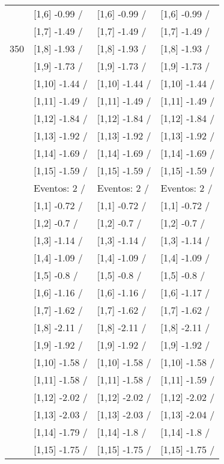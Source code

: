 \begin{table}
\begin{tabular}[t]{llll}
 & {}[1,6] -0.99  / & {}[1,6] -0.99  / & {}[1,6] -0.99  /\\
 & {}[1,7] -1.49  / & {}[1,7] -1.49  / & {}[1,7] -1.49  /\\
350 & {}[1,8] -1.93  / & {}[1,8] -1.93  / & {}[1,8] -1.93  /\\
\addlinespace
 & {}[1,9] -1.73  / & {}[1,9] -1.73  / & {}[1,9] -1.73  /\\
 & {}[1,10] -1.44  / & {}[1,10] -1.44  / & {}[1,10] -1.44  /\\
 & {}[1,11] -1.49  / & {}[1,11] -1.49  / & {}[1,11] -1.49  /\\
 & {}[1,12] -1.84  / & {}[1,12] -1.84  / & {}[1,12] -1.84  /\\
 & {}[1,13] -1.92  / & {}[1,13] -1.92  / & {}[1,13] -1.92  /\\
\addlinespace
 & {}[1,14] -1.69  / & {}[1,14] -1.69  / & {}[1,14] -1.69  /\\
 & {}[1,15] -1.59  / & {}[1,15] -1.59  / & {}[1,15] -1.59  /\\
 & Eventos:  2 / & Eventos:  2 / & Eventos:  2 /\\
 & {}[1,1] -0.72  / & {}[1,1] -0.72  / & {}[1,1] -0.72  /\\
 & {}[1,2] -0.7  / & {}[1,2] -0.7  / & {}[1,2] -0.7  /\\
\addlinespace
 & {}[1,3] -1.14  / & {}[1,3] -1.14  / & {}[1,3] -1.14  /\\
 & {}[1,4] -1.09  / & {}[1,4] -1.09  / & {}[1,4] -1.09  /\\
 & {}[1,5] -0.8  / & {}[1,5] -0.8  / & {}[1,5] -0.8  /\\
 & {}[1,6] -1.16  / & {}[1,6] -1.16  / & {}[1,6] -1.17  /\\
 & {}[1,7] -1.62  / & {}[1,7] -1.62  / & {}[1,7] -1.62  /\\
\addlinespace
500 & {}[1,8] -2.11  / & {}[1,8] -2.11  / & {}[1,8] -2.11  /\\
 & {}[1,9] -1.92  / & {}[1,9] -1.92  / & {}[1,9] -1.92  /\\
 & {}[1,10] -1.58  / & {}[1,10] -1.58  / & {}[1,10] -1.58  /\\
 & {}[1,11] -1.58  / & {}[1,11] -1.58  / & {}[1,11] -1.59  /\\
 & {}[1,12] -2.02  / & {}[1,12] -2.02  / & {}[1,12] -2.02  /\\
\addlinespace
 & {}[1,13] -2.03  / & {}[1,13] -2.03  / & {}[1,13] -2.04  /\\
 & {}[1,14] -1.79  / & {}[1,14] -1.8  / & {}[1,14] -1.8  /\\
 & {}[1,15] -1.75  / & {}[1,15] -1.75  / & {}[1,15] -1.75  /\\
\bottomrule
\end{tabular}
\end{table}
